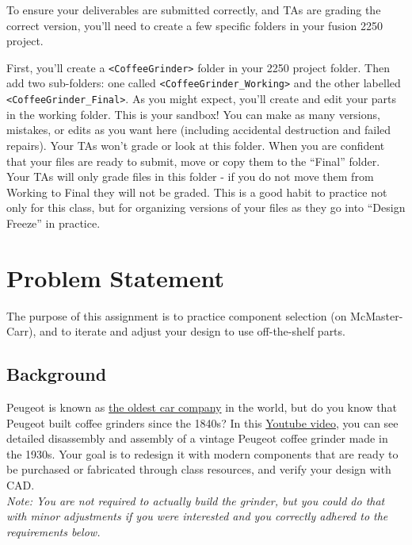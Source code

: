 \documentclass[11pt]{article}
\begin{document}
\MakeHandoutHeader



To ensure your deliverables are submitted correctly, and TAs are grading the correct version, you'll need to create a few specific folders in your fusion 2250 project.

First, you'll create a \texttt{<CoffeeGrinder>} folder in your 2250 project folder.
Then add two sub-folders: one called \texttt{<CoffeeGrinder\_Working>} and the other labelled \texttt{<CoffeeGrinder\_Final>}.
As you might expect, you'll create and edit your parts in the working folder.
This is your sandbox!
You can make as many versions, mistakes, or edits as you want here (including accidental destruction and failed repairs).
Your TAs won't grade or look at this folder.
When you are confident that your files are ready to submit, move or copy them to the “Final” folder.
Your TAs will only grade files in this folder - if you do not move them from Working to Final they will not be graded.
This is a good habit to practice not only for this class, but for organizing versions of your files as they go into “Design Freeze” in practice.

\section{Problem Statement}
The purpose of this assignment is to practice component selection (on McMaster-Carr), and to iterate and adjust your design to use off-the-shelf parts.
\subsection*{Background}
Peugeot is known as \href{https://en.wikipedia.org/wiki/Peugeot}{the oldest car company} in the world, but do you know that Peugeot built coffee grinders since the 1840s? In this \href{https://www.youtube.com/watch?v=biTUPDVP57Y}{Youtube video}, you can see detailed disassembly and assembly of a vintage Peugeot coffee grinder made in the 1930s. Your goal is to redesign it with modern components that are ready to be purchased or fabricated through class resources, and verify your design with CAD. \\
\textit{Note: You are not required to actually build the grinder, but you could do that with minor adjustments if you were interested and you correctly adhered to the requirements below. }
\end{document}
